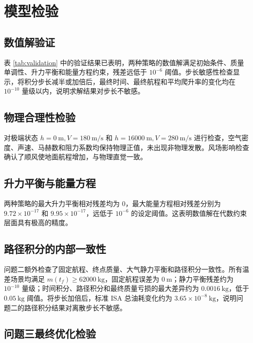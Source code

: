 \documentclass[withoutpreface,bwprint]{cumcmthesis}
\begin{document}
\section{模型检验}

\subsection{数值解验证}

表 \ref{tab:validation} 中的验证结果已表明，两种策略的数值解满足初始条件、质量单调性、升力平衡和能量方程约束，残差远低于 $10^{-6}$ 阈值。步长敏感性检查显示，将积分步长减半或加倍后，最终时间、最终航程和平均爬升率的变化均在 $10^{-10}$ 量级以内，说明求解结果对步长不敏感。

\subsection{物理合理性检验}

对极端状态 $h=0\ \mathrm{m}, V=180\ \mathrm{m/s}$ 和 $h=16000\ \mathrm{m}, V=280\ \mathrm{m/s}$ 进行检查，空气密度、声速、马赫数和阻力系数均保持物理正值，未出现非物理发散。风场影响检查确认了顺风使地面航程增加，与物理直觉一致。

\subsection{升力平衡与能量方程}

两种策略的最大升力平衡相对残差均为 $0$，最大能量方程相对残差分别为 $9.72\times 10^{-17}$ 和 $9.95\times 10^{-17}$，远低于 $10^{-6}$ 的设定阈值。这表明数值解在代数约束层面具有极高的精度。

\subsection{路径积分的内部一致性}

问题二额外检查了固定航程、终点质量、大气静力平衡和路径积分一致性。所有温差场景均满足 $m(t_f)\geq62000\ \mathrm{kg}$，固定航程误差为 $0\ \mathrm{m}$；静力平衡残差约为 $10^{-10}$ 量级；时间积分、路径积分和最终质量亏损的最大差异约为 $0.0016\ \mathrm{kg}$，低于 $0.05\ \mathrm{kg}$ 阈值。将步长加倍后，标准 ISA 总油耗变化约为 $3.65\times10^{-8}\ \mathrm{kg}$，说明问题二的路径积分结果对离散步长不敏感。

\subsection{问题三最终优化检验}
\end{document}
